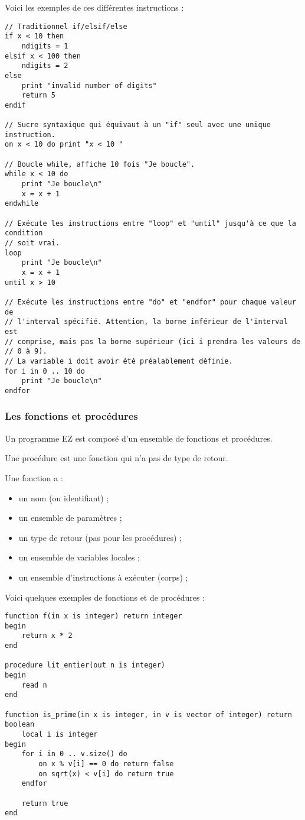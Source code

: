 Voici les exemples de ces différentes instructions :
\begin{verbatim}
// Traditionnel if/elsif/else
if x < 10 then
    ndigits = 1
elsif x < 100 then
    ndigits = 2
else
    print "invalid number of digits"
    return 5
endif

// Sucre syntaxique qui équivaut à un "if" seul avec une unique instruction.
on x < 10 do print "x < 10 "

// Boucle while, affiche 10 fois "Je boucle".
while x < 10 do
    print "Je boucle\n"
    x = x + 1
endwhile

// Exécute les instructions entre "loop" et "until" jusqu'à ce que la condition
// soit vrai.
loop
    print "Je boucle\n"
    x = x + 1
until x > 10

// Exécute les instructions entre "do" et "endfor" pour chaque valeur de
// l'interval spécifié. Attention, la borne inférieur de l'interval est
// comprise, mais pas la borne supérieur (ici i prendra les valeurs de
// 0 à 9).
// La variable i doit avoir été préalablement définie.
for i in 0 .. 10 do
    print "Je boucle\n"
endfor
\end{verbatim}



\subsubsection{Les fonctions et procédures}

Un programme EZ est composé d'un ensemble de fonctions et procédures.

Une procédure est une fonction qui n'a pas de type de retour.

Une fonction a :
\begin{itemize}
    \item un nom (ou identifiant) ;
    \item un ensemble de paramètres ;
    \item un type de retour (pas pour les procédures) ;
    \item un ensemble de variables locales ;
    \item un ensemble d'instructions à exécuter (corps) ;
\end{itemize}

Voici quelques exemples de fonctions et de procédures :
\begin{verbatim}
function f(in x is integer) return integer
begin
    return x * 2
end

procedure lit_entier(out n is integer)
begin
    read n
end

function is_prime(in x is integer, in v is vector of integer) return boolean
    local i is integer
begin
    for i in 0 .. v.size() do
        on x % v[i] == 0 do return false
        on sqrt(x) < v[i] do return true
    endfor

    return true
end
\end{verbatim}

